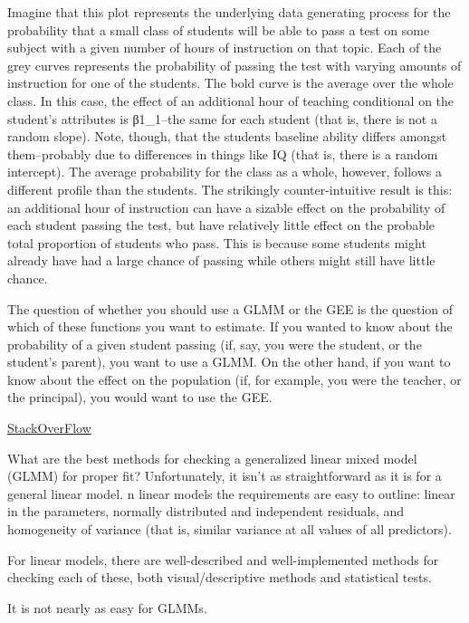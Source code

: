 \documentclass[
]{book}
\begin{document}
Imagine that this plot represents the underlying data generating process for the probability that a small class of students will be able to pass a test on some subject with a given number of hours of instruction on that topic. Each of the grey curves represents the probability of passing the test with varying amounts of instruction for one of the students. The bold curve is the average over the whole class. In this case, the effect of an additional hour of teaching conditional on the student's attributes is β1\beta\_1--the same for each student (that is, there is not a random slope). Note, though, that the students baseline ability differs amongst them--probably due to differences in things like IQ (that is, there is a random intercept). The average probability for the class as a whole, however, follows a different profile than the students. The strikingly counter-intuitive result is this: an additional hour of instruction can have a sizable effect on the probability of each student passing the test, but have relatively little effect on the probable total proportion of students who pass. This is because some students might already have had a large chance of passing while others might still have little chance.

The question of whether you should use a GLMM or the GEE is the question of which of these functions you want to estimate. If you wanted to know about the probability of a given student passing (if, say, you were the student, or the student's parent), you want to use a GLMM. On the other hand, if you want to know about the effect on the population (if, for example, you were the teacher, or the principal), you would want to use the GEE.

\href{https://stats.stackexchange.com/questions/32419/difference-between-generalized-linear-models-generalized-linear-mixed-models}{StackOverFlow}

What are the best methods for checking a generalized linear mixed model (GLMM) for proper fit?
Unfortunately, it isn't as straightforward as it is for a general linear model.
n linear models the requirements are easy to outline: linear in the parameters, normally distributed and independent residuals, and homogeneity of variance (that is, similar variance at all values of all predictors).

For linear models, there are well-described and well-implemented methods for checking each of these, both visual/descriptive methods and statistical tests.

It is not nearly as easy for GLMMs.
\end{document}
